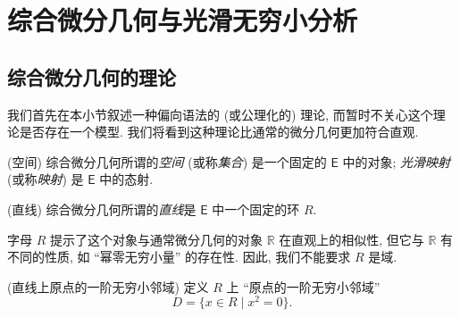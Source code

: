 \section{综合微分几何与光滑无穷小分析}

\subsection{综合微分几何的理论}

我们首先在本小节叙述一种偏向语法的 (或公理化的) 理论, 而暂时不关心这个理论是否存在一个模型. 我们将看到这种理论比通常的微分几何更加符合直观.

\begin{axiom}
	{(空间)}
	综合微分几何所谓的\emph{空间} (或称\emph{集合}) 是一个固定的\topos{} $\mathsf E$ 中的对象; \emph{光滑映射} (或称\emph{映射}) 是 $\mathsf E$ 中的态射.
\end{axiom}

\begin{axiom}
	{(直线)}
	综合微分几何所谓的\emph{直线}是 $\mathsf E$ 中一个固定的环 $R$.
\end{axiom}

\begin{remark}
	{}
	字母 $R$ 提示了这个对象与通常微分几何的对象 $\mathbb{R}$ 在直观上的相似性, 但它与 $\mathbb{R}$ 有不同的性质, 如 ``幂零无穷小量'' 的存在性. 因此, 我们不能要求 $R$ 是域.
\end{remark}

\begin{definition}
	{(直线上原点的一阶无穷小邻域)}
	定义 $R$ 上 ``原点的一阶无穷小邻域''
	$$
	D = \{x \in R \mid x^2 = 0\}.
	$$
\end{definition}


